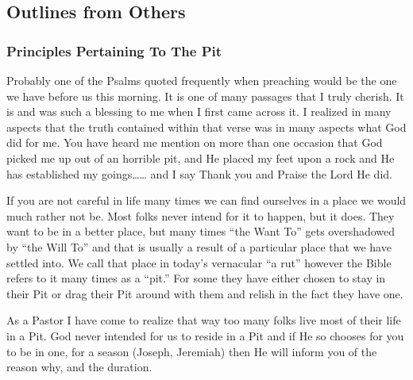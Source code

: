 \subsection{Outlines from Others}

\subsubsection{Principles Pertaining To The Pit}
Probably one of the Psalms  quoted frequently when preaching would be the one we have before us this morning. It is one of many passages that I truly cherish. It is and was such a blessing to me when I first came across it. I realized in many aspects that the truth contained within that verse was in many aspects what God did for me. You have heard me mention on more than one occasion that God picked me up out of an horrible pit, and He placed my feet upon a rock and He has established my goings…… and I say Thank you and Praise the Lord He did.

If you are not careful in life many times we can find ourselves in a place we would much rather not be. Most folks never intend for it to happen, but it does. They want to be in a better place, but many times “the Want To” gets overshadowed by “the Will To” and that is usually a result of a particular place that we have settled into. We call that place in today’s vernacular “a rut” however the Bible refers to it many times as a “pit.” For some they have either chosen to stay in their Pit or drag their Pit around with them and relish in the fact they have one.

As a Pastor I have come to realize that way too many folks live most of their life in a Pit. God never intended for us to reside in a Pit and if He so chooses for you to be in one, for a season (Joseph, Jeremiah) then He will inform you of the reason why, and the duration.

